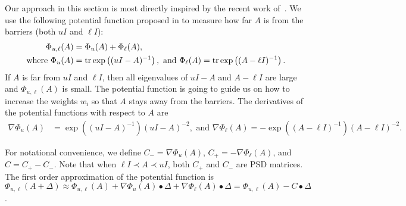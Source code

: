 Our approach in this section is most directly inspired by the recent work of~\cite{LeeS17}.
We use the following potential function proposed in \citep{LeeS17} to measure how far $A$ is from the barriers (both $uI$ and $\ell I$):
\begin{align*}
\Phi_{u,\ell}(A) & = \Phi_u(A) + \Phi_\ell(A), \\
\text{ where } \Phi_u(A) & = \operatorname{tr} \exp \left((u I - A)^{-1}\right), \text{ and } \Phi_\ell(A) = \operatorname{tr} \exp \left((A - \ell I)^{-1}\right).
\end{align*}
If $A$ is far from $u I$ and $\ell I$, then all eigenvalues of $uI - A$ and $A - \ell I$ are large and $\Phi_{u,\ell}(A)$ is small.
The potential function is going to guide us on how to increase the weights $w_i$ so that $A$ stays away from the barriers.
The derivatives of the potential functions with respect to $A$ are
\begin{align*}
\nabla \Phi_u (A) & = \exp \left((u I - A)^{-1}\right) (u I - A)^{-2}, \text{ and } 
\nabla \Phi_\ell (A) = - \exp \left((A - \ell I)^{-1}\right) (A - \ell I)^{-2}.
\end{align*}

For notational convenience, we define $C_{-} = \nabla \Phi_u (A)$, $C_{+} = -\nabla \Phi_\ell (A)$, and $C = C_+ - C_-$.
Note that when $\ell I \prec A \prec u I$, both $C_+$ and $C_-$ are PSD matrices.
The first order approximation of the potential function is
$\Phi_{u,\ell}(A+\Delta)
 \approx \Phi_{u,\ell}(A) + \nabla \Phi_{u}(A) \bullet \Delta + \nabla \Phi_{\ell}(A) \bullet \Delta 
 = \Phi_{u,\ell}(A) - C \bullet \Delta$.


